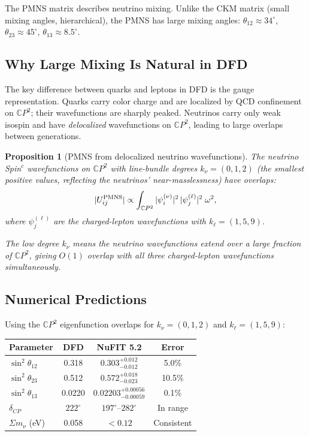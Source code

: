 \documentclass[11pt,a4paper]{article}
\newtheorem{proposition}[theorem]{Proposition}
\theoremstyle{remark}
\newcommand{\CP}{\mathbb{C}P}
\begin{document}
The PMNS matrix describes neutrino mixing. Unlike the CKM matrix (small
mixing angles, hierarchical), the PMNS has large mixing angles:
$\theta_{12} \approx 34^\circ$, $\theta_{23} \approx 45^\circ$,
$\theta_{13} \approx 8.5^\circ$.

\subsection{Why Large Mixing Is Natural in DFD}

The key difference between quarks and leptons in DFD is the gauge
representation. Quarks carry color charge and are localized by QCD
confinement on $\CP^2$; their wavefunctions are sharply peaked.
Neutrinos carry only weak isospin and have \emph{delocalized}
wavefunctions on $\CP^2$, leading to large overlaps between generations.

\begin{proposition}[PMNS from delocalized neutrino wavefunctions]
\label{prop:PMNS}
The neutrino Spin$^c$ wavefunctions on $\CP^2$ with line-bundle
degrees $k_\nu = (0, 1, 2)$ (the smallest positive values, reflecting
the neutrinos' near-masslessness) have overlaps:
\begin{equation}
|U_{ij}^{\rm PMNS}| \propto \int_{\CP^2} |\psi_i^{(\nu)}|^2\,|\psi_j^{(\ell)}|^2\;\omega^2,
\end{equation}
where $\psi_j^{(\ell)}$ are the charged-lepton wavefunctions with
$k_\ell = (1, 5, 9)$.

The low degree $k_\nu$ means the neutrino wavefunctions extend over
a large fraction of $\CP^2$, giving $O(1)$ overlap with all three
charged-lepton wavefunctions simultaneously.
\end{proposition}

\subsection{Numerical Predictions}

Using the $\CP^2$ eigenfunction overlaps for $k_\nu = (0, 1, 2)$
and $k_\ell = (1, 5, 9)$:

\begin{center}
\begin{tabular}{lccc}
\toprule
\textbf{Parameter} & \textbf{DFD} & \textbf{NuFIT 5.2} & \textbf{Error} \\
\midrule
$\sin^2\theta_{12}$ & 0.318 & $0.303^{+0.012}_{-0.012}$ & 5.0\% \\
$\sin^2\theta_{23}$ & 0.512 & $0.572^{+0.018}_{-0.023}$ & 10.5\% \\
$\sin^2\theta_{13}$ & 0.0220 & $0.02203^{+0.00056}_{-0.00059}$ & 0.1\% \\
$\delta_{CP}$ & $222^\circ$ & $197^\circ$--$282^\circ$ & In range \\
\midrule
$\Sigma m_\nu$ (eV) & 0.058 & $< 0.12$ & Consistent \\
\bottomrule
\end{tabular}
\end{center}
\end{document}
